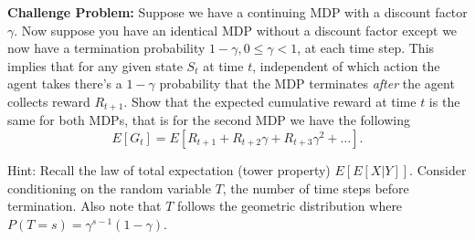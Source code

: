\textbf{Challenge Problem:} Suppose we have a continuing MDP with a discount factor $\gamma$.
Now suppose you have an identical MDP without a discount factor except we
now have a termination probability $1-\gamma, 0 \leq \gamma <1$, at each
time step.
This implies that for any given state $S_t$ at time $t$, independent of which action
the agent takes there's a $1-\gamma$ probability that the MDP terminates 
\textit{after}
the agent collects reward $R_{t+1}$.
Show that the expected cumulative reward at time $t$ is the same for both
MDPs, that is for the second MDP we have the following
\[
	E[G_t] = E[R_{t+1}+R_{t+2}\gamma + R_{t+3}\gamma^2 +\dots].
\]

Hint: Recall the law of total expectation (tower property)
$E\left[E\left[X|Y\right]\right]$. Consider conditioning on the random
variable $T$, the number of time steps before termination.
Also note that $T$ follows the geometric distribution where
$P(T=s) = \gamma^{s-1}(1-\gamma)$.

\smallspace
